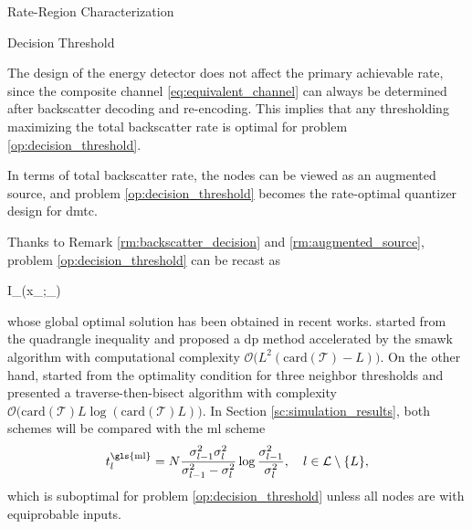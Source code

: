 \begin{section}{Rate-Region Characterization}
\begin{subsection}{Decision Threshold}
		\begin{remark}
			The design of the energy detector does not affect the primary achievable rate, since the composite channel \eqref{eq:equivalent_channel} can always be determined after backscatter decoding and re-encoding.
			This implies that any thresholding maximizing the total backscatter rate is optimal for problem \eqref{op:decision_threshold}.
			\label{rm:backscatter_decision}
		\end{remark}

		\begin{remark}
			In terms of total backscatter rate, the nodes can be viewed as an augmented source, and problem \eqref{op:decision_threshold} becomes the rate-optimal quantizer design for \gls{dmtc}.
			\label{rm:augmented_source}
		\end{remark}

		Thanks to Remark \ref{rm:backscatter_decision} and \ref{rm:augmented_source}, problem \eqref{op:decision_threshold} can be recast as
		\begin{maxi!}
			{}{I_{}(x_{};_{})}{\label{op:decision_threshold_discrete}}{\label{ob:decision_threshold_discrete}}
			\addConstraint{\eqref{co:sequential_threshold},}
		\end{maxi!}
		whose global optimal solution has been obtained in recent works.
		\cite{He2021} started from the quadrangle inequality and proposed a \gls{dp} method accelerated by the \gls{smawk} algorithm with computational complexity $\mathcal{O}\bigl(L^2(\mathrm{card}(\mathcal{T}){-}L)\bigr)$.
		On the other hand, \cite{Nguyen2020a} started from the optimality condition for three neighbor thresholds and presented a traverse-then-bisect algorithm with complexity $\mathcal{O}\bigl(\mathrm{card}(\mathcal{T})L\log(\mathrm{card}(\mathcal{T})L)\bigr)$.
		In Section \ref{sc:simulation_results}, both schemes will be compared with the \gls{ml} scheme \cite{Qian2019}
		\begin{equation}
			t_{l}^{\text{\gls{ml}}} = N \frac{\sigma_{l-1}^2 \sigma_{l}^2}{\sigma_{l-1}^2 - \sigma_{l}^2} \log \frac{\sigma_{l-1}^2}{\sigma_{l}^2}, \quad l \in \mathcal{L} \setminus \{L\},
			\label{eq:detection_threshold_ml}
		\end{equation}
		which is suboptimal for problem \eqref{op:decision_threshold} unless all nodes are with equiprobable inputs.
	\end{subsection}
\end{section}


